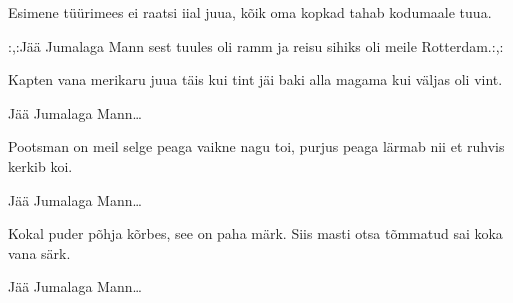Esimene t\"u\"urimees ei raatsi iial juua,
k\~oik oma kopkad tahab kodumaale tuua.

:,:J\"a\"a Jumalaga Mann sest tuules oli ramm
ja reisu sihiks oli meile Rotterdam.:,: 

Kapten vana merikaru juua t\"ais kui tint
j\"ai baki alla magama kui v\"aljas oli vint.

J\"a\"a Jumalaga Mann\ldots

Pootsman on meil selge peaga vaikne nagu toi,
purjus peaga l\"armab nii et ruhvis kerkib koi.

J\"a\"a Jumalaga Mann\ldots

Kokal puder p\~ohja k\~orbes, see on paha m\"ark.
Siis masti otsa t\~ommatud sai koka vana s\"ark.

J\"a\"a Jumalaga Mann\ldots